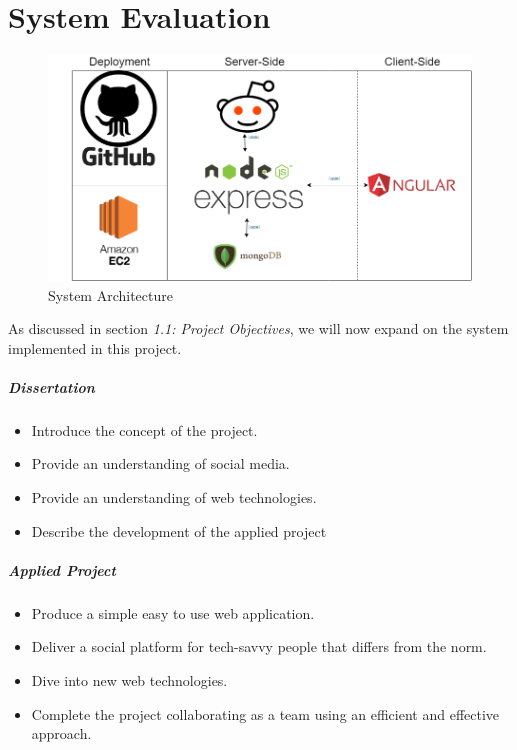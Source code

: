 \chapter{System Evaluation} \label{eval}

\begin{figure}[H]
  \includegraphics[width=\linewidth]{img/Diagram.png}
  \caption{System Architecture}
  \label{fig:GHP}
\end{figure}

As discussed in section \textit{1.1: Project Objectives}, we will now expand on the system implemented in this project.

\paragraph{Dissertation}
\begin{itemize}
\item Introduce the concept of the project. 
\item Provide an understanding of social media.
\item Provide an understanding of web technologies.
\item Describe the development of the applied project
\end{itemize}
 
 \paragraph{Applied Project}
\begin{itemize}
\item Produce a simple easy to use web application.
\item Deliver a social platform for tech-savvy people that differs from the norm.
\item Dive into new web technologies.
\item Complete the project collaborating as a team using an efficient and effective approach.
\end{itemize}

